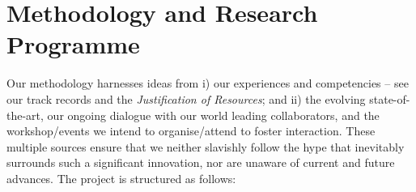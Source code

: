 \documentclass[a4paper,11pt]{article}
\begin{document}


\vspace*{-0.2in}

\section{Methodology and Research Programme}
\vspace*{-0.1in}

Our methodology harnesses ideas from i) our experiences and
competencies -- see our track records and the {\em
  Justification of Resources}; and 
ii) the evolving state-of-the-art, our ongoing dialogue with our
world leading collaborators, and the workshop/events we intend to
organise/attend to foster interaction. These multiple sources ensure that we neither
slavishly follow the hype that inevitably surrounds such a significant
innovation, nor are unaware of current and future advances. The
project is structured as follows:



\end{document}
